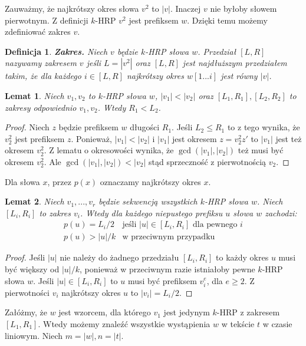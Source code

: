 \documentclass{article}
\newtheorem{definition}{Definicja}[section]
\newtheorem{lemma}{Lemat}[section]
\begin{document}
Zauważmy, że najkrótszy okres słowa $v^2$ to $|v|$. Inaczej $v$ nie byłoby słowem pierwotnym. Z definicji $k$-HRP $v^2$ jest prefiksem $w$. Dzięki temu możemy zdefiniować zakres $v$.

\begin{definition}
\textbf{\textit{Zakres.}}
Niech $v$ będzie $k$-HRP słowa $w$. Przedział $[L, R]$ nazywamy zakresem $v$ jeśli $L = |v^2|$ oraz $[L,R]$ jest najdłuższym przedziałem takim, że dla każdego $i \in [L, R]$ najkrótszy okres $w[1...i]$ jest równy $|v|$.
\end{definition}

\begin{lemma}\label{Lem_1}
Niech $v_1, v_2$ to $k$-HRP słowa $w$, $|v_1| < |v_2|$ oraz $[L_1, R_1], [L_2, R_2]$ to zakresy odpowiednio $v_1, v_2$. Wtedy $R_1 < L_2$.
\end{lemma}
\begin{proof}
Niech $z$ będzie prefiksem $w$ długości $R_1$. Jeśli $L_2 \leq R_1$ to z tego wynika, że $v_2^2$ jest prefiksem $z$. Ponieważ, $|v_1| < |v_2|$ i $|v_1|$ jest okresem $z = v_2^2 z'$ to $|v_1|$ jest też okresem $v_2^2$. Z lematu o okresowości wynika, że $\gcd(|v_1|, |v_2|)$ też musi być okresem $v_2^2$. Ale $\gcd(|v_1|, |v_2|) < |v_2|$ stąd sprzeczność z pierwotnością $v_2$.
\end{proof}

Dla słowa $x$, przez $p(x)$ oznaczamy najkrótszy okres $x$.

\begin{lemma}\label{Lem_2}
Niech $v_1, ..., v_r$ będzie sekwencją wszystkich $k$-HRP słowa $w$. Niech $[L_i, R_i]$ to zakres $v_i$. Wtedy dla każdego niepustego prefiksu $u$ słowa $w$ zachodzi:
$$\begin{array}{rl}
    p(u) = L_i/2 & \text{jeśli $|u| \in [L_i, R_i]$ dla pewnego $i$} \\
    p(u) > |u|/k & \text{w przeciwnym przypadku}
\end{array}$$
\end{lemma}
\begin{proof}
Jeśli $|u|$ nie należy do żadnego przedziału $[L_i, R_i]$ to każdy okres $u$ musi być większy od $|u|/k$, ponieważ w przeciwnym razie istniałoby pewne $k$-HRP słowa $w$.
Jeśli $|u| \in [L_i, R_i]$ to $u$ musi być prefiksem $v_i^e$, dla $e \geq 2$. Z pierwotności $v_i$ najkrótszy okres $u$ to $|v_i| = L_i / 2$.
\end{proof}

Załóżmy, że $w$ jest wzorcem, dla którego $v_1$ jest jedynym $k$-HRP z zakresem $[L_1, R_1]$. Wtedy możemy znaleźć wszystkie wystąpienia $w$ w tekście $t$ w czasie liniowym.
Niech $m = |w|, n = |t|$.
\end{document}
